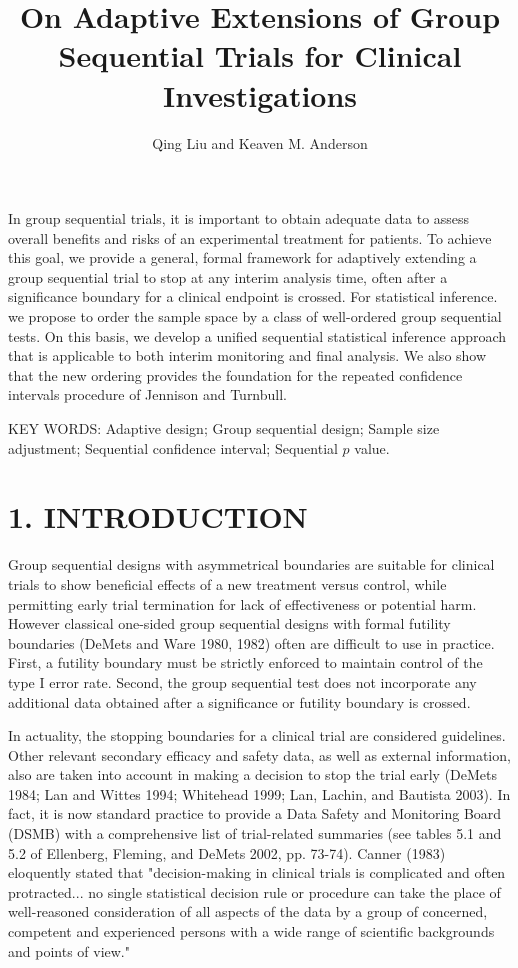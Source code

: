 \documentclass[10pt]{article}
\title{On Adaptive Extensions of Group Sequential Trials for Clinical Investigations}
\author{Qing Liu and Keaven M. Anderson}
\date{}
\begin{document}
\maketitle

In group sequential trials, it is important to obtain adequate data to assess overall benefits and risks of an experimental treatment for patients. To achieve this goal, we provide a general, formal framework for adaptively extending a group sequential trial to stop at any interim analysis time, often after a significance boundary for a clinical endpoint is crossed. For statistical inference. we propose to order the sample space by a class of well-ordered group sequential tests. On this basis, we develop a unified sequential statistical inference approach that is applicable to both interim monitoring and final analysis. We also show that the new ordering provides the foundation for the repeated confidence intervals procedure of Jennison and Turnbull.

KEY WORDS: Adaptive design; Group sequential design; Sample size adjustment; Sequential confidence interval; Sequential $p$ value.

\section*{1. INTRODUCTION}
Group sequential designs with asymmetrical boundaries are suitable for clinical trials to show beneficial effects of a new treatment versus control, while permitting early trial termination for lack of effectiveness or potential harm. However classical one-sided group sequential designs with formal futility boundaries (DeMets and Ware 1980, 1982) often are difficult to use in practice. First, a futility boundary must be strictly enforced to maintain control of the type I error rate. Second, the group sequential test does not incorporate any additional data obtained after a significance or futility boundary is crossed.

In actuality, the stopping boundaries for a clinical trial are considered guidelines. Other relevant secondary efficacy and safety data, as well as external information, also are taken into account in making a decision to stop the trial early (DeMets 1984; Lan and Wittes 1994; Whitehead 1999; Lan, Lachin, and Bautista 2003). In fact, it is now standard practice to provide a Data Safety and Monitoring Board (DSMB) with a comprehensive list of trial-related summaries (see tables 5.1 and 5.2 of Ellenberg, Fleming, and DeMets 2002, pp. 73-74). Canner (1983) eloquently stated that "decision-making in clinical trials is complicated and often protracted... no single statistical decision rule or procedure can take the place of well-reasoned consideration of all aspects of the data by a group of concerned, competent and experienced persons with a wide range of scientific backgrounds and points of view."
\end{document}
